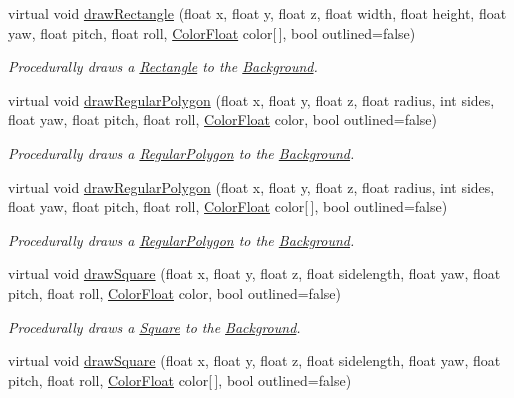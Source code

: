 \begin{DoxyCompactItemize}
virtual void \hyperlink{classtsgl_1_1_background_a3aa5208683cfeaafacabaebf751c6934}{draw\+Rectangle} (float x, float y, float z, float width, float height, float yaw, float pitch, float roll, \hyperlink{structtsgl_1_1_color_float}{Color\+Float} color\mbox{[}$\,$\mbox{]}, bool outlined=false)
\begin{DoxyCompactList}\small\item\em Procedurally draws a \hyperlink{classtsgl_1_1_rectangle}{Rectangle} to the \hyperlink{classtsgl_1_1_background}{Background}. \end{DoxyCompactList}\item 
virtual void \hyperlink{classtsgl_1_1_background_ae795bb0037fa1bdab23d4499db2a917b}{draw\+Regular\+Polygon} (float x, float y, float z, float radius, int sides, float yaw, float pitch, float roll, \hyperlink{structtsgl_1_1_color_float}{Color\+Float} color, bool outlined=false)
\begin{DoxyCompactList}\small\item\em Procedurally draws a \hyperlink{classtsgl_1_1_regular_polygon}{Regular\+Polygon} to the \hyperlink{classtsgl_1_1_background}{Background}. \end{DoxyCompactList}\item 
virtual void \hyperlink{classtsgl_1_1_background_a6b5abcdfd723135876be9445e2d8de97}{draw\+Regular\+Polygon} (float x, float y, float z, float radius, int sides, float yaw, float pitch, float roll, \hyperlink{structtsgl_1_1_color_float}{Color\+Float} color\mbox{[}$\,$\mbox{]}, bool outlined=false)
\begin{DoxyCompactList}\small\item\em Procedurally draws a \hyperlink{classtsgl_1_1_regular_polygon}{Regular\+Polygon} to the \hyperlink{classtsgl_1_1_background}{Background}. \end{DoxyCompactList}\item 
virtual void \hyperlink{classtsgl_1_1_background_a90228388af2736c0d8ca13f3483caed1}{draw\+Square} (float x, float y, float z, float sidelength, float yaw, float pitch, float roll, \hyperlink{structtsgl_1_1_color_float}{Color\+Float} color, bool outlined=false)
\begin{DoxyCompactList}\small\item\em Procedurally draws a \hyperlink{classtsgl_1_1_square}{Square} to the \hyperlink{classtsgl_1_1_background}{Background}. \end{DoxyCompactList}\item 
virtual void \hyperlink{classtsgl_1_1_background_a1eed2db2c90aebeeeeff13b6e9a5b0e2}{draw\+Square} (float x, float y, float z, float sidelength, float yaw, float pitch, float roll, \hyperlink{structtsgl_1_1_color_float}{Color\+Float} color\mbox{[}$\,$\mbox{]}, bool outlined=false)

\end{DoxyCompactItemize}
